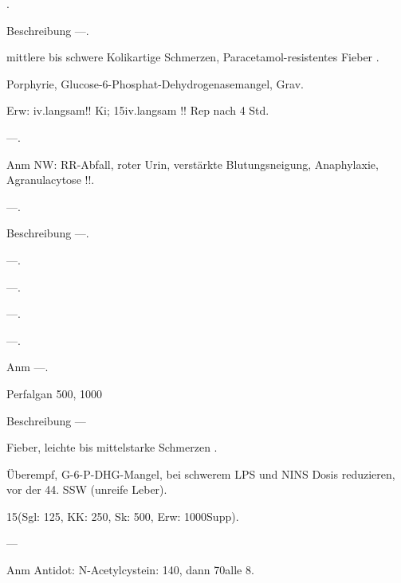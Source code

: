 {
\begin{MedikamentCharakteristika}
  \item[{\TxItemSpezialitaeten}]  .
  \item[Beschreibung] ---.
  \item[{\TxItemIndikation}]  mittlere bis schwere Kolikartige 
  Schmerzen, Paracetamol-resistentes
Fieber .
  \item[{\TxItemKontraindikation}] Porphyrie, 
  Glucose-6-Phosphat-Dehydrogenasemangel, Grav.
  \item[{\TxItemDosierung}] Erw: \Gramm* 
  iv.langsam!!\newline
Ki; 15\MgKg*iv.langsam !!\newline
Rep nach 4 Std.
  \item[{\TxItemCave}] ---.
  \item[Anm] NW: RR-Abfall, roter Urin, verstärkte Blutungsneigung, 
  Anaphylaxie,
Agranulacytose !!.
\end{MedikamentCharakteristika}}
{}




{
\begin{MedikamentCharakteristika}
  \item[{\TxItemSpezialitaeten}] ---.
  \item[Beschreibung] ---.
  \item[{\TxItemIndikation}] ---.
  \item[{\TxItemKontraindikation}] ---.
  \item[{\TxItemDosierung}] ---.
  \item[{\TxItemCave}] ---.
  \item[Anm] ---.
\end{MedikamentCharakteristika}}
{}




{
\begin{MedikamentCharakteristika}
  \item[{\TxItemSpezialitaeten}] 
  Perfalgan{\texttrademark} 500\Mg*, 1000\Mg*
  \item[Beschreibung] ---
  \item[{\TxItemIndikation}]  Fieber, leichte bis mittelstarke 
  Schmerzen .
  \item[{\TxItemKontraindikation}] Überempf, G-6-P-DHG-Mangel, bei 
  schwerem LPS und NINS Dosis
reduzieren, vor der 44. SSW (unreife Leber).
  \item[{\TxItemDosierung}] 15\MgKg* (Sgl: 125, KK: 250, Sk: 500, 
  Erw: 1000\Mg*
  Supp).
  \item[{\TxItemCave}] ---
  \item[Anm] Antidot: N-Acetylcystein: 140\MgKg*, dann
  70\MgKg* alle 8\Hour*.
\end{MedikamentCharakteristika}}
{}



